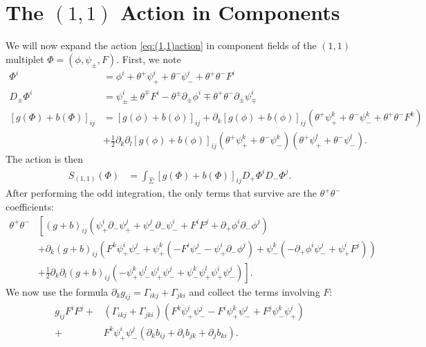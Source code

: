 \documentclass{article}
\newcommand{\p}{\partial}
\theoremstyle{definition}
\theoremstyle{definition}
\theoremstyle{remark}
\begin{document}
\section*{The $(1,1)$ Action in Components}
We will now expand the action \eqref{eq:(1,1)action} in component fields of the $(1,1)$ multiplet $\Phi=(\phi,\psi_\pm,F)$. First, we note
\begin{align*}
\Phi^i&=\phi^i+\theta^+\psi^i_++\theta^-\psi^i_-+\theta^+\theta^-F^i\\
D_\pm\Phi^i&=\psi^i_\pm\pm\theta^\mp F^i-\theta^\pm\p_\pm\phi^i\mp\theta^+\theta^-\p_\pm\psi^i_\mp\\
[g(\Phi)+b(\Phi)]_{ij}&=[g(\phi)+b(\phi)]_{ij}+\p_k[g(\phi)+b(\phi)]_{ij}(\theta^+\psi_+^k+\theta^-\psi_-^k+\theta^+\theta^-F^k)\\
&+\frac{1}{2}\p_k\p_l[g(\phi)+b(\phi)]_{ij}(\theta^+\psi_+^k+\theta^-\psi_-^k)(\theta^+\psi_+^l+\theta^-\psi_-^l).
\end{align*}
The action is then
\begin{align*}
S_{(1,1)}(\Phi)&=\int_{\hat{\Sigma}}[g(\Phi)+b(\Phi)]_{ij}D_+\Phi^iD_-\Phi^j.
\end{align*}
After performing the odd integration, the only terms that survive are the $\theta^+\theta^-$ coefficients:
\begin{align*}
\theta^+\theta^-&\left[(g+b)_{ij}(\psi_+^i\p_-\psi^j_++\psi^j_-\p_-\psi^i_-+F^iF^j+\p_+\phi^i\p_-\phi^j)\right. \\
&+\p_k(g+b)_{ij}\left(F^k\psi^i_+\psi^j_-+\psi^k_+(-F^i\psi^j_--\psi^i_+\p_-\phi^j)+\psi^k_-(-\p_+\phi^i\psi^j_-+\psi_+^iF^j)\right)\\
&\left. +\frac{1}{2}\p_k\p_l(g+b)_{ij}(-\psi_+^k\psi_-^l\psi_+^i\psi_-^j+\psi_-^k\psi_+^l\psi^i_+\psi^j_-) \right].
\end{align*}
We now use the formula $\p_kg_{ij}=\Gamma_{ikj}+\Gamma_{jki}$
and collect the terms involving $F$:
\begin{align*}
g_{ij}F^iF^j+&(\Gamma_{ikj}+\Gamma_{jki})(F^k\psi^i_+\psi^j_--F^i\psi^k_+\psi^j_-+F^j\psi^k_-\psi_+^i)\\
+&F^k\psi^i_+\psi^j_-(\p_kb_{ij}+\p_ib_{jk}+\p_jb_{ki}).
\end{align*}
\end{document}
